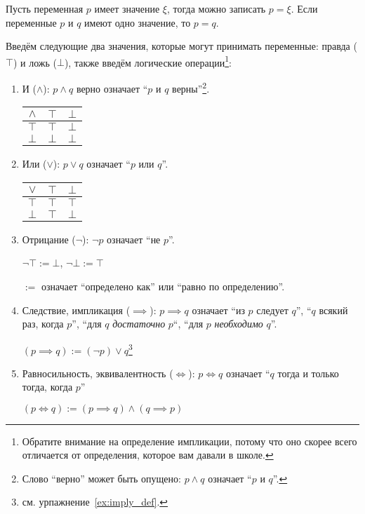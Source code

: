 Пусть переменная $p$ имеет значение $\xi$, тогда можно записать $p=\xi$. Если переменные
$p$ и $q$ имеют одно значение, то $p=q$.

Введём следующие два значения, которые могут принимать
переменные: правда ($\top$) и ложь ($\bot$), также введём логические
операции\footnote{Обратите внимание на определение импликации, потому что оно
	скорее всего отличается от определения, которое вам давали в школе.}:
\begin{enumerate}
	\item{}И ($\land$): $p\land q$ верно означает ``$p$ и $q$
	верны''\footnote{Слово ``верно'' может быть опущено: $p\land q$
		означает ``$p$ и $q$''.}.

	\begin{tabular}{c|cc}
		$\land$ & $\top$ & $\bot$ \\\hline
		$\top$  & $\top$ & $\bot$ \\
		$\bot$  & $\bot$ & $\bot$
	\end{tabular}

	\pagebreak

	\item{}Или ($\lor$): $p\lor q$ означает ``$p$ или $q$''.

	\begin{tabular}{c|cc}
		$\lor$ & $\top$ & $\bot$ \\\hline
		$\top$ & $\top$ & $\top$ \\
		$\bot$ & $\top$ & $\bot$
	\end{tabular}

	\item{} Отрицание ($\lnot$): $\lnot p$ означает ``не $p$''.

	$\lnot\top:=\bot$, $\lnot\bot:=\top$

	$:=$ означает ``определено как'' или ``равно по определению''.

	\item{}Следствие, импликация (${\implies}$): ${p\implies q}$ означает
	``из $p$ следует $q$'', ``$q$ всякий раз, когда $p$'', ``для $q$ {\it достаточно} $p$``,
	``для $p$ {\it необходимо} $q$''.

	$(p\implies q):=(\lnot p)\lor q$\footnote{см. урпажнение~\ref{ex:imply_def}.}

	\item{}Равносильность, эквивалентность (${\iff}$):
	${p\iff q}$ означает ``$q$ тогда и только
	тогда, когда $p$''

	$(p\iff q):=(p\implies q)\land (q\implies p)$
\end{enumerate}

